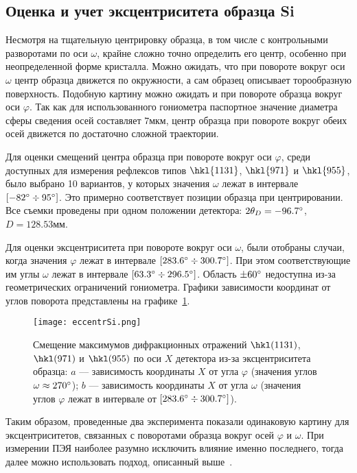\subsection{Оценка и учет эксцентриситета образца Si}
Несмотря на тщательную центрировку образца, в том числе с контрольными разворотами по оси $\omega$, крайне сложно точно определить его центр, особенно при неопределенной форме кристалла.
Можно ожидать, что при повороте вокруг оси $\omega$ центр образца движется по окружности, а сам образец описывает торообразную поверхность.
Подобную картину можно ожидать и при повороте образца вокруг оси $\varphi$.
Так как для использованного гониометра паспортное значение диаметра сферы сведения осей составляет $7\unit{мкм}$, центр образца при повороте вокруг обеих осей движется по достаточно сложной траектории.

Для оценки смещений центра образца при повороте вокруг оси $\varphi$, среди доступных для измерения рефлексов типов $\hkl{11 3 1}$, $\hkl{9 7 1}$ и $\hkl{9 5 5}$, было выбрано 10 вариантов, у которых значения $\omega$ лежат в интервале $[-82^\circ\div95^\circ]$.
Это примерно соответствует позиции образца при центрировании.
Все съемки проведены при одном положении детектора: $2\theta_D = -96.7^\circ$, $D = 128.53\unit{мм}$.

Для оценки эксцентриситета при повороте вокруг оси $\omega$, были отобраны случаи, когда значения $\varphi$ лежат в интервале $[283.6^\circ\div300.7^\circ]$.
При этом соответствующие им углы $\omega$ лежат в интервале $[63.3^\circ\div296.5^\circ]$.
Область $\pm 60^\circ$ недоступна из-за геометрических ограничений гониометра.
Графики зависимости координат от углов поворота представлены на графике~\ref{fig:eccentrSi}.

\begin{figure}[ht!]
    \centering
    \texttt{[image: eccentrSi.png]}
    \caption{Смещение максимумов дифракционных отражений $\hkl(11 3 1)$, $\hkl(9 7 1)$ и $\hkl(9 5 5)$ по оси $X$ детектора из-за эксцентриситета образца: $a$ --– зависимость координаты $X$ от угла $\varphi$ (значения углов $\omega \approx 270^\circ$); $b$ --- зависимость координаты $X$ от угла $\omega$ (значения углов $\varphi$ лежат в интервале от $[283.6^\circ\div300.7^\circ]$).}
    \label{fig:eccentrSi}
\end{figure}

Таким образом, проведенные два эксперимента показали одинаковую картину для эксцентриситетов, связанных с поворотами образца вокруг осей $\varphi$ и $\omega$.
При измерении ПЭЯ наиболее разумно исключить влияние именно последнего, тогда далее можно использовать подход, описанный выше~\cite{Ponomarev:1969}.

